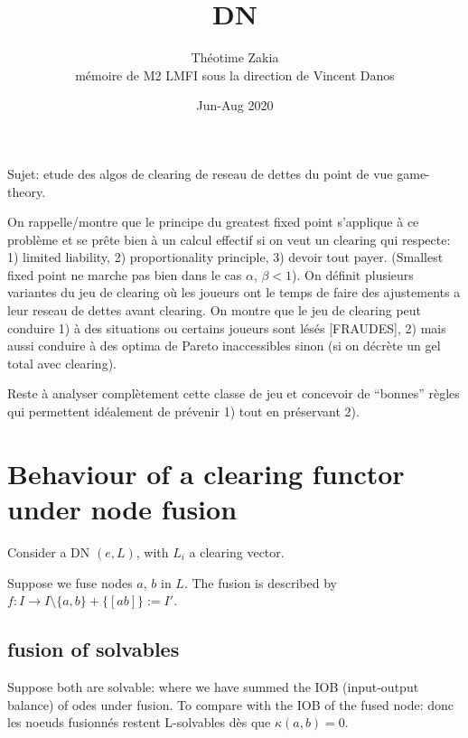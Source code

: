 \documentclass[11pt,oneside,twocolumn]{article}
\title{DN}
\author
{
Théotime Zakia
\\ 
mémoire de M2 LMFI sous la direction de Vincent Danos
}
\date{Jun-Aug 2020}
\begin{document}
\maketitle

Sujet: etude des algos de clearing de reseau de dettes du point de vue game-theory.

On rappelle/montre que le principe du greatest fixed point s'applique à ce problème
et se prête bien à un calcul effectif si on veut un clearing qui respecte:
1) limited liability, 
2) proportionality principle, 
3) devoir tout payer. 
(Smallest fixed point ne marche pas bien dans le cas 
$\alpha$, 
$\beta <1$). 
On définit plusieurs variantes du jeu de clearing où les joueurs ont le temps de faire des ajustements a leur reseau de dettes avant clearing. On montre que le jeu de
clearing peut conduire 1) à des situations ou certains joueurs sont lésés [FRAUDES], 2) mais aussi conduire à des optima de Pareto inaccessibles sinon (si on décrète un gel total avec clearing).

Reste à analyser complètement cette classe de jeu et concevoir de ``bonnes'' règles qui permettent idéalement de prévenir 1) tout en préservant 2). 

\section{
Behaviour of a clearing functor
under node fusion}

Consider a DN $(e,L)$, with $L_i$
a clearing vector.


Suppose we fuse nodes $a$, $b$ in $L$.
The fusion is described by
$f: I \to I\setminus\{a,b\}+\{[ab]\}:=I'$.


\subsection{fusion of solvables} 
Suppose both are solvable:
where we have summed the IOB (input-output balance) of odes under fusion.
To compare with the IOB of the fused node:
donc les noeuds fusionnés restent L-solvables
dès que 
$\kappa(a,b)=0$.
\end{document}
